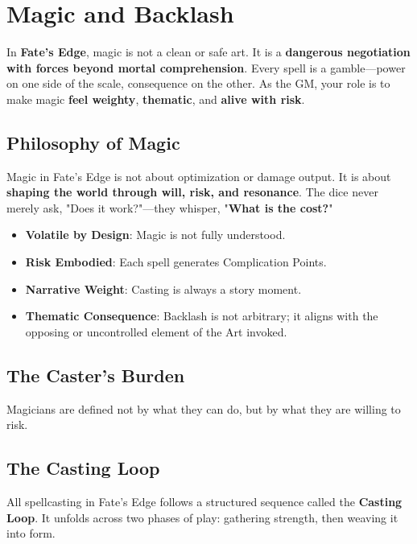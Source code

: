 
\chapter{Magic and Backlash}

In \textbf{Fate's Edge}, magic is not a clean or safe art. It is a \textbf{dangerous negotiation with forces beyond mortal comprehension}. Every spell is a gamble—power on one side of the scale, consequence on the other. As the GM, your role is to make magic \textbf{feel weighty}, \textbf{thematic}, and \textbf{alive with risk}.

\section*{Philosophy of Magic}

Magic in Fate's Edge is not about optimization or damage output. It is about \textbf{shaping the world through will, risk, and resonance}. The dice never merely ask, "Does it work?"—they whisper, "\textbf{What is the cost?}"

\begin{itemize}
    \item \textbf{Volatile by Design}: Magic is not fully understood.
    \item \textbf{Risk Embodied}: Each spell generates Complication Points.
    \item \textbf{Narrative Weight}: Casting is always a story moment.
    \item \textbf{Thematic Consequence}: Backlash is not arbitrary; it aligns with the opposing or uncontrolled element of the Art invoked.
\end{itemize}

\section*{The Caster's Burden}

Magicians are defined not by what they can do, but by what they are willing to risk.

\section*{The Casting Loop}

All spellcasting in Fate's Edge follows a structured sequence called the \textbf{Casting Loop}. It unfolds across two phases of play: gathering strength, then weaving it into form.

